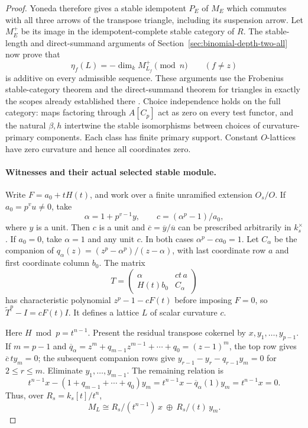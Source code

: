 \begin{proof}
Yoneda therefore gives a stable idempotent $P_E$ of $M_E$
which commutes with all three arrows of the transpose
triangle, including its suspension arrow.
Let $M_E^+$ be its image in the idempotent-complete stable
category of $R$.  The stable-length and direct-summand
arguments of Section~\ref{sec:binomial-depth-two-all} now
prove that
\[
 \eta_f(L)=-\dim_k M_{L_f}^+\pmod n\qquad(f\ne z)
\]
is additive on every admissible sequence.
These arguments use the Frobenius stable-category theorem
and the direct-summand theorem for triangles in exactly the
scopes already established there
\citep[Section~13.4, Theorem~13.7, author p.~50]{Buhler2010}
\citep[Lemma~1.6 and proof, pp.~821--822]{BalmerSchlichting2001}.
Choice independence holds on the full category: maps
factoring through $A[C_p]$ act as zero on every test functor,
and the natural $\beta,h$ intertwine the stable isomorphisms
between choices of curvature-primary components.
Each class has finite primary support.  Constant $O$-lattices
have zero curvature and hence all coordinates zero.

\paragraph{Witnesses and their actual selected stable module.}
Write $F=a_0+tH(t)$, and work over a finite unramified
extension $O_s/O$.  If $a_0=p^v u\ne0$, take
\[
 \alpha=1+p^{v-1}y,\qquad c=(\alpha^p-1)/a_0,
\]
where $y$ is a unit.  Then $c$ is a unit and
$\overline c=\overline y/\overline u$ can be prescribed
arbitrarily in $k_s^\times$.
If $a_0=0$, take $\alpha=1$ and any unit $c$.
In both cases $\alpha^p-ca_0=1$.
Let $C_\alpha$ be the companion of
$q_\alpha(z)=(z^p-\alpha^p)/(z-\alpha)$,
with last coordinate row $a$ and first coordinate column $b_0$.
The matrix
\[
 T=\begin{pmatrix}\alpha&ct\,a\\H(t)b_0&C_\alpha\end{pmatrix}
\]
has characteristic polynomial $z^p-1-cF(t)$ before imposing
$F=0$, so $\widetilde T^p-I=cF(t)I$.
It defines a lattice $L$ of scalar curvature $c$.

Here $H\bmod p=t^{n-1}$.
Present the residual transpose cokernel by
$x,y_1,\ldots,y_{p-1}$.
If $m=p-1$ and
$\overline q_\alpha=z^m+q_{m-1}z^{m-1}+\cdots+q_0=(z-1)^m$,
the top row gives $\overline c\,t y_m=0$; the subsequent
companion rows give
$y_{r-1}-y_r-q_{r-1}y_m=0$ for $2\le r\le m$.
Eliminate $y_1,\ldots,y_{m-1}$.
The remaining relation is
\[
 t^{n-1}x-(1+q_{m-1}+\cdots+q_0)y_m
 =t^{n-1}x-\overline q_\alpha(1)y_m=t^{n-1}x=0.
\]
Thus, over $R_s=k_s[t]/t^n$,
\begin{equation}\label{eq:shallow-witness-transpose}
 M_L\cong R_s/(t^{n-1})\,x\ \oplus\ R_s/(t)\,y_m.
\end{equation}


\end{proof}
